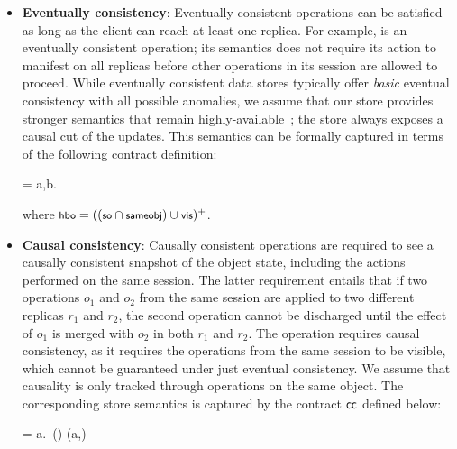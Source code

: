\begin{itemize}
\setlength{\itemsep}{2pt}

\item \textbf{Eventually consistency}: Eventually consistent operations can
  be satisfied as long as the client can reach at least one replica. For
  example,  is an eventually consistent operation; its semantics
  does not require its action to manifest on all replicas before other
  operations in its session are allowed to proceed. While eventually
  consistent data stores typically offer \emph{basic} eventual consistency
  with all possible anomalies, we assume that our store provides stronger
  semantics that remain highly-available~\cite{BailisHAT,COPS}; the store
  always exposes a causal cut of the updates. This semantics can be formally
  captured in terms of the following contract definition:

  \vspace{-1em}
  \begin{smathpar}
  \ecc = \forall a,b. ~ \wedge {} \Rightarrow {}
  \end{smathpar}
  \noindent where $\small \hboZ = ((\soZ \cap \sameobjZ) \cup \visZ)^+$.

\item \textbf{Causal consistency}: Causally consistent operations are required
	to see a causally consistent snapshot of the object state, including the
	actions performed on the same session.  The latter requirement entails that
	if two operations $o_1$ and $o_2$ from the same session are applied to two
	different replicas $r_1$ and $r_2$, the second operation cannot be discharged
	until the effect of $o_1$ is merged with $o_2$ in both $r_1$ and $r_2$. The
	 operation requires causal consistency, as it requires the
	operations from the same session to be visible, which cannot be guaranteed
	under just eventual consistency. We assume that causality is only tracked
	through operations on the same object. The corresponding store semantics is
	captured by the contract ${\sf cc}$ defined below:

  \vspace{-1em}
  \begin{smathpar}
  \ccc = \forall a.~(\hboZ \cap \sameobjZ) (a,\cureff) \Rightarrow {}
  \end{smathpar}



\end{itemize}
